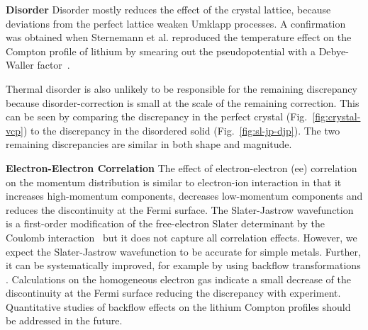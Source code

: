\documentclass[aps,prb,showpacs,preprintnumbers,amsmath,amssymb,superscriptaddress,twocolumn]{revtex4-1}
\newcommand{\david}[1]{ \textcolor{red}{\textbf{DC: #1}}}
\begin{document}
{\bf Disorder}  Disorder mostly reduces the effect of the crystal lattice, because deviations from the perfect lattice weaken Umklapp processes. A confirmation was obtained when Sternemann et al. reproduced the temperature effect on the Compton profile of lithium by smearing out the pseudopotential with a Debye-Waller factor~\cite{Sternemann2001}.

Thermal disorder is also unlikely to be responsible for the remaining discrepancy because disorder-correction is small at the scale of the remaining correction. This can be seen by comparing the discrepancy in the perfect crystal (Fig.~\ref{fig:crystal-vcp}) to the discrepancy in the disordered solid (Fig.~\ref{fig:sl-jp-djp}). The two remaining discrepancies are similar in both shape and magnitude.


{\bf Electron-Electron Correlation}  The effect of electron-electron (ee) correlation on the momentum distribution is similar to electron-ion interaction in that it increases high-momentum components, decreases low-momentum components and reduces the discontinuity at the Fermi surface. %
The Slater-Jastrow wavefunction is a first-order modification of the free-electron Slater determinant by the Coulomb interaction~\cite{Holzmann2003} %
but it does not capture all correlation effects.
However, we expect the Slater-Jastrow wavefunction to be accurate for simple metals. 
Further, it can be systematically improved, for example by using backflow transformations \cite{PhysRevB.91.115106}. 
Calculations on the homogeneous electron gas indicate a small decrease of the discontinuity
at the Fermi 
surface \cite{Holzmann2011} reducing the discrepancy with experiment. Quantitative studies of
backflow effects on the lithium Compton profiles should be addressed in the future.
\end{document}
